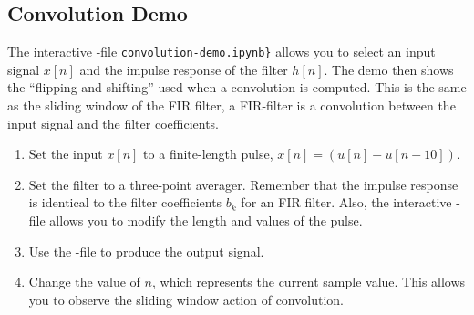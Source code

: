 \subsection{Convolution Demo}
The interactive \jupyterlab-file \verb|convolution-demo.ipynb}|	allows you to select an input signal $x[n]$ and the impulse response of the filter $h[n]$. 
The demo then shows the “flipping and shifting” used when a convolution is computed. This is the same as the
sliding window of the FIR filter, a FIR-filter is a convolution between the input signal and the filter coefficients. 
\begin{enumerate}[1)]
	\item Set the input $x[n]$ to a finite-length pulse, $x[n] = (u[n]-u[n-10])$.
	
	\item Set the filter to a three-point averager. 
		Remember that the impulse response is identical to the filter coefficients $b_k$ for an FIR filter. Also, the interactive \jupyterlab-file allows you to modify the length and values of the pulse.
		
	\item Use the \jupyterlab-file  to produce the output signal.

	\item Change the value of $n$, which represents the current sample value. This allows you to observe the sliding window action of convolution. 
	
\end{enumerate}

